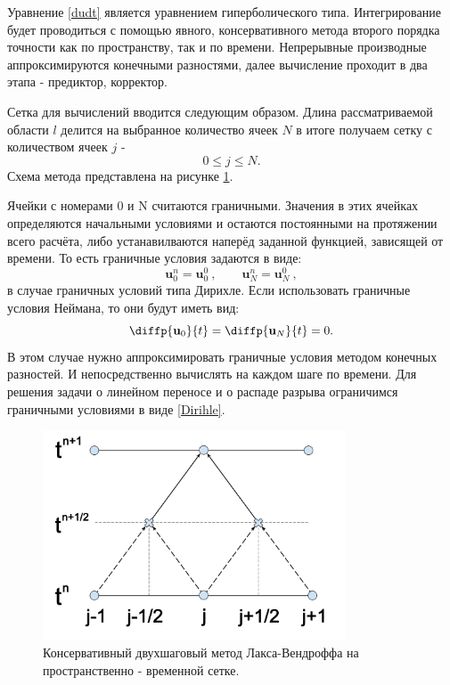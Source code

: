 \documentclass[a4paper]{article}
\begin{document}
	Уравнение \ref{dudt} является уравнением гиперболического типа. Интегрирование будет проводиться с помощью явного, консервативного метода второго порядка точности как по пространству, так и по времени. 
	Непрерывные производные аппроксимируются конечными разностями, далее вычисление проходит в два этапа - предиктор, корректор.
	
	Сетка для вычислений вводится следующим образом. Длина рассматриваемой области $l$ делится на выбранное количество ячеек $N$ в итоге получаем сетку с количеством ячеек $j$ - 
	\[
	0 \leqslant j \leqslant N .
	\]
	Схема метода представлена на рисунке \ref{LW_picture}.

	Ячейки с номерами 0 и N считаются граничными. Значения в этих ячейках определяются начальными условиями и остаются постоянными на протяжении всего расчёта, либо устанавилваются наперёд заданной функцией, зависящей от времени. То есть граничные условия задаются в виде:
	\begin{equation}\label{Dirihle}
	\mathbf{u}_0^n = \mathbf{u}_0^0	\:,	\qquad	\mathbf{u}_N^n = \mathbf{u}_N^0 \:,
	\end{equation}
	в случае граничных условий типа Дирихле. Если использовать граничные условия Неймана, то они будут иметь вид:
	\begin{equation}
	\diffp{\mathbf{u}_{0}}{t} = \diffp{\mathbf{u}_{N}}{t} = 0 .
	\end{equation}
	В этом случае нужно аппроксимировать граничные условия методом конечных разностей. И непосредственно вычислять на каждом шаге по времени. 
	Для решения задачи о линейном переносе и о распаде разрыва ограничимся граничными условиями в виде \eqref{Dirihle}.
	
	\begin{figure}
		\centering
		\includegraphics[width=0.8\textwidth]{Lax-Wendroff.pdf}
		\caption{Консервативный двухшаговый метод Лакса-Вендроффа на пространственно - временной сетке.}
		\label{LW_picture}
	\end{figure}
\end{document}
